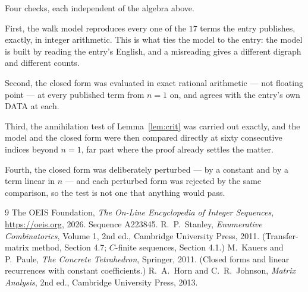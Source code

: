 \documentclass[11pt,a4paper]{article}
\theoremstyle{plain}
\theoremstyle{definition}
\begin{document}
Four checks, each independent of the algebra above.

First, the walk model reproduces every one of the $17$ terms the entry publishes,
exactly, in integer arithmetic. This is what ties the model to the entry: the model is built
by reading the entry's English, and a misreading gives a different digraph and different
counts.

Second, the closed form was evaluated in exact rational arithmetic --- not floating point ---
at every published term from $n=1$ on, and agrees with the entry's own DATA at each.

Third, the annihilation test of Lemma~\ref{lem:crit} was carried out exactly, and the model
and the closed form were then compared directly at sixty consecutive indices beyond
$n=1$, far past where the proof already settles the matter.

Fourth, the closed form was deliberately perturbed --- by a constant and by a term linear in
$n$ --- and each perturbed form was rejected by the same comparison, so the test is not one
that anything would pass.

\begin{thebibliography}{9}
 The OEIS Foundation, \emph{The On-Line Encyclopedia of Integer
Sequences}, \url{https://oeis.org}, 2026. Sequence A223845.
 R.~P.~Stanley, \emph{Enumerative Combinatorics}, Volume 1, 2nd ed.,
Cambridge University Press, 2011. (Transfer-matrix method, Section 4.7; $C$-finite sequences,
Section 4.1.)
 M.~Kauers and P.~Paule, \emph{The Concrete Tetrahedron}, Springer, 2011.
(Closed forms and linear recurrences with constant coefficients.)
 R.~A.~Horn and C.~R.~Johnson, \emph{Matrix Analysis}, 2nd ed., Cambridge
University Press, 2013.
\end{thebibliography}
\end{document}
